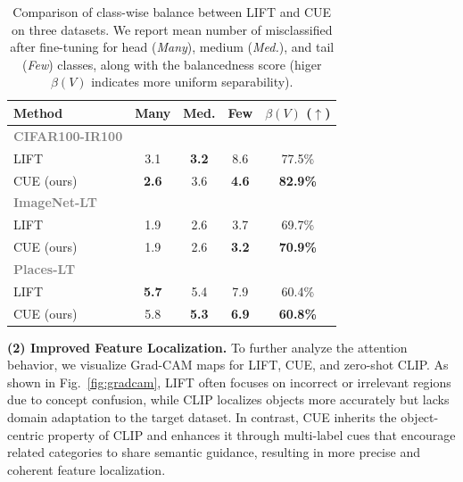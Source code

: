 \begin{table}[!t]
\centering
\caption{Comparison of class-wise balance between LIFT and CUE on three datasets. 
We report mean number of misclassified after fine-tuning for head (\textit{Many}), medium  (\textit{Med.}), and tail (\textit{Few}) classes, 
along with the balancedness score (higer $\beta(V)$ indicates more uniform separability).}
\vspace{-0.5em}
\label{tab:balance}
\footnotesize
\begin{tabular}{l|cccc}
\toprule
\textbf{Method} & \textbf{Many} & \textbf{Med.} & \textbf{Few} & $\beta(V)$\textbf{ ($\uparrow$)} \\
\midrule
\textcolor{gray}{\textbf{CIFAR100-IR100}} & & & & \\
\quad LIFT & 3.1 & \textbf{3.2} & 8.6 & 77.5\% \\
\quad CUE (ours) & \textbf{2.6} & 3.6 & \textbf{4.6} & \textbf{82.9\%} \\[3pt]
\midrule
\textcolor{gray}{\textbf{ImageNet-LT}} & & & & \\
\quad LIFT & 1.9 & 2.6 & 3.7 & 69.7\% \\
\quad CUE (ours) & 1.9 & 2.6 & \textbf{3.2} & \textbf{70.9\%} \\[3pt]
\midrule
\textcolor{gray}{\textbf{Places-LT}} & & & & \\
\quad LIFT & \textbf{5.7} & 5.4 & 7.9 & 60.4\% \\
\quad CUE (ours) & 5.8 & \textbf{5.3} & \textbf{6.9} & \textbf{60.8\%} \\

\bottomrule
\end{tabular}
\vspace{-1.5em}
\end{table}




\noindent \textbf{(2) Improved Feature Localization.}
To further analyze the attention behavior, we visualize Grad-CAM maps for LIFT, CUE, and zero-shot CLIP. As shown in Fig.~\ref{fig:gradcam}, LIFT often focuses on incorrect or irrelevant regions due to concept confusion, while CLIP localizes objects more accurately but lacks domain adaptation to the target dataset. In contrast, CUE inherits the object-centric property of CLIP and enhances it through multi-label cues that encourage related categories to share semantic guidance, resulting in more precise and coherent feature localization.



